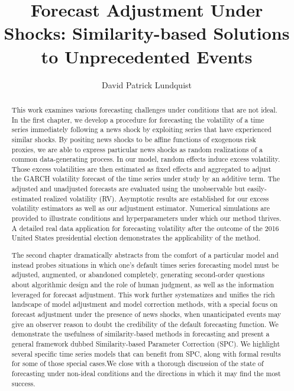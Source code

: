 \documentclass{uiucthesis2021}
\theoremstyle{definition}
\begin{document}
\title{Forecast Adjustment Under Shocks: Similarity-based Solutions to Unprecedented Events}
\author{David Patrick Lundquist}
\phdthesis
{}
\maketitle


\frontmatter

\begin{abstract}
    This work examines various forecasting challenges under conditions that are not ideal.  In the first chapter, we develop a procedure for forecasting the volatility of a time series immediately following a news shock by exploiting  series that have experienced similar shocks.  By positing news shocks to be affine functions of exogenous risk proxies, we are able to express particular news shocks as random realizations of a common data-generating process.  In our model, random effects induce excess volatility.  Those excess volatilities are then estimated as fixed effects and aggregated to adjust the GARCH volatility forecast of the time series under study by an additive term.  The adjusted and unadjusted forecasts are evaluated using the unobservable but easily-estimated realized volatility (RV).  Asymptotic results are established for our excess volatility estimators as well as our adjustment estimator.  Numerical simulations are provided to illustrate conditions and hyperparameters under which our method thrives. A detailed real data application for forecasting volatility after the outcome of the 2016 United States presidential election demonstrates the applicability of the method.

    The second chapter dramatically abstracts from the comfort of a particular model and instead probes situations in which one's default times series forecasting model must be adjusted, augmented, or abandoned completely, generating second-order questions about algorithmic design and the role of human judgment, as well as the information leveraged for forecast adjustment.  This work further systematizes and unifies the rich landscape of model adjustment and model correction methods, with a special focus on forecast adjustment under the presence of news shocks, when unanticipated events may give an observer reason to doubt the credibility of the default forecasting function.  We demonstrate the usefulness of similarity-based methods in forecasting and present a general framework dubbed Similarity-based Parameter Correction (SPC).  We highlight several specific time series models that can benefit from SPC, along with formal results for some of those special cases.We close with a thorough discussion of the state of forecasting under non-ideal conditions and the directions in which it may find the most success.
\end{abstract}
\end{document}
